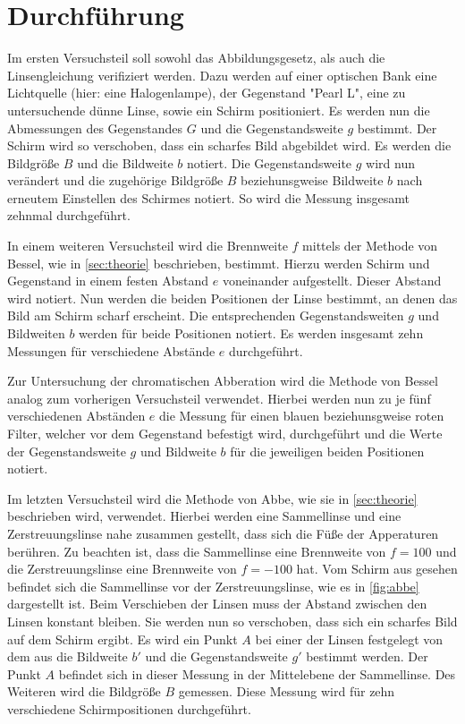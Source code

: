 \section{Durchführung}
\label{sec:Durchführung}
Im ersten Versuchsteil soll sowohl das Abbildungsgesetz, als auch die Linsengleichung verifiziert werden. Dazu werden auf einer optischen 
Bank eine Lichtquelle (hier: eine Halogenlampe), der Gegenstand "Pearl L", eine zu untersuchende dünne Linse, sowie ein Schirm positioniert.
Es werden nun die Abmessungen des Gegenstandes $G$ und die Gegenstandsweite $g$ bestimmt. Der Schirm wird so verschoben, dass ein scharfes 
Bild abgebildet wird. Es werden die Bildgröße $B$ und die Bildweite $b$ notiert. Die Gegenstandsweite $g$ wird nun verändert und die zugehörige
Bildgröße $B$ beziehunsgweise Bildweite $b$ nach erneutem Einstellen des Schirmes notiert. So wird die Messung insgesamt zehnmal durchgeführt.

In einem weiteren Versuchsteil wird die Brennweite $f$ mittels der Methode von Bessel, wie in \autoref{sec:theorie} beschrieben, bestimmt.
Hierzu werden Schirm und Gegenstand in einem festen Abstand $e$ voneinander aufgestellt. Dieser Abstand wird notiert. Nun werden die beiden
Positionen der Linse bestimmt, an denen das Bild am Schirm scharf erscheint. Die entsprechenden Gegenstandsweiten $g$ und Bildweiten $b$
werden für beide Positionen notiert. Es werden insgesamt zehn Messungen für verschiedene Abstände $e$ durchgeführt.  

Zur Untersuchung der chromatischen Abberation wird die Methode von Bessel analog zum vorherigen Versuchsteil verwendet. Hierbei werden nun 
zu je fünf verschiedenen Abständen $e$ die Messung für einen blauen beziehunsgweise roten Filter, welcher vor dem Gegenstand befestigt wird,
durchgeführt und die Werte der Gegenstandsweite $g$ und Bildweite $b$ für die jeweiligen beiden Positionen notiert.

Im letzten Versuchsteil wird die Methode von Abbe, wie sie in \autoref{sec:theorie} beschrieben wird, verwendet. Hierbei werden eine Sammellinse
und eine Zerstreuungslinse nahe zusammen gestellt, dass sich die Füße der Apperaturen berühren. Zu beachten ist, dass die Sammellinse
eine Brennweite von $f = 100$ und die Zerstreuungslinse eine Brennweite von $f = -100$ hat. Vom Schirm aus gesehen befindet sich die
Sammellinse vor der Zerstreuungslinse, wie es in \autoref{fig:abbe} dargestellt ist. Beim Verschieben der Linsen muss der Abstand
zwischen den Linsen konstant bleiben. Sie werden nun so verschoben, dass sich ein scharfes Bild auf dem Schirm ergibt. Es wird ein Punkt $A$
bei einer der Linsen festgelegt von dem aus die Bildweite $b'$ und die Gegenstandsweite $g'$ bestimmt werden. Der Punkt $A$ befindet sich
in dieser Messung in der Mittelebene der Sammellinse. Des Weiteren wird die Bildgröße $B$ gemessen. Diese Messung wird für zehn verschiedene
Schirmpositionen durchgeführt.